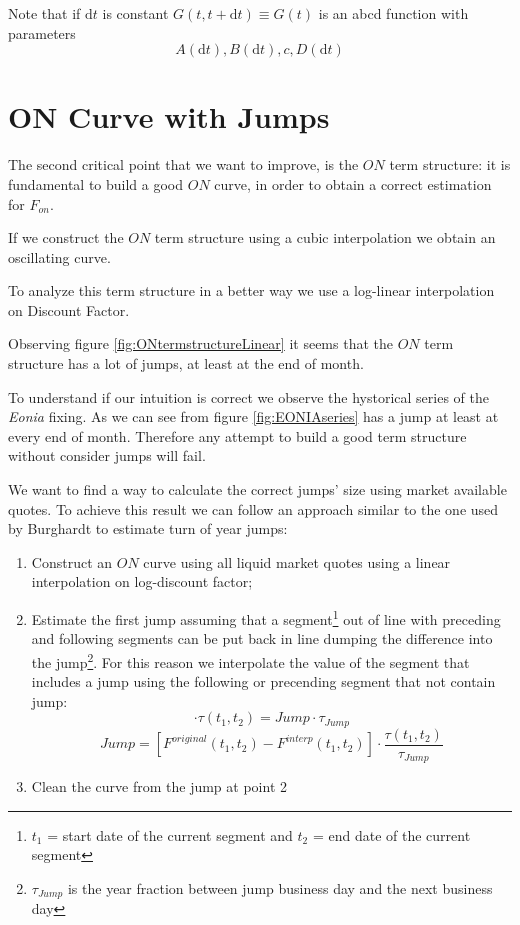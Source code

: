 \documentclass{article}
\begin{document}
\begin{appendices}
\begin{itemize}
Note that if $\mathrm{d}t$ is constant $G(t,t+\mathrm{d}t)\equiv G(t)$ is an abcd function with parameters $$A(\mathrm{d}t),B(\mathrm{d}t),c,D(\mathrm{d}t)$$

\end{itemize}

\section{ON Curve with Jumps} \label{app:ON Curve with Jumps}
The second critical point that we want to improve, is the $ON$ term structure: it is fundamental to build a good $ON$ curve, in order to obtain a correct estimation for $F_{on}$.

If we construct the $ON$ term structure using a cubic interpolation we obtain an oscillating curve.

To analyze this term structure in a better way we use a log-linear interpolation on Discount Factor.

Observing figure \ref{fig:ONtermstructureLinear} it seems that the $ON$ term structure has a lot of jumps, at least at the end of month.

To understand if our intuition is correct we observe the hystorical series of the \textit{Eonia} fixing. As we can see from figure \ref{fig:EONIAseries} has a jump at least at every end of month. Therefore any attempt to build a good term structure without consider jumps will fail.

We want to find a way to calculate the correct jumps' size using market available quotes. To achieve this result we can follow an approach similar to the one used by Burghardt \cite{Burghardt} to estimate turn of year jumps:
\begin{enumerate}
\item Construct an $ON$ curve using all liquid market quotes using a linear interpolation on log-discount factor;
\item Estimate the first jump assuming that a segment\footnote{$t_1$ = start date of the current segment and $t_2$ = end date of the current segment} out of line with preceding and following segments can be put back in line dumping the difference into the jump\footnote{$\tau_{Jump}$ is the year fraction between jump business day and the next business day}. For this reason we interpolate the value of the segment that includes a jump using the following or precending segment that not contain jump:
        \begin{equation}
        [F^{original}(t_1,t_2) - F^{interp}(t_1,t_2)] \cdot \tau(t_1,t_2) = Jump \cdot \tau_{Jump}
        \end{equation}
        \begin{equation}
        Jump = [F^{original}(t_1,t_2) - F^{interp}(t_1,t_2)]\cdot \frac{\tau(t_1,t_2)}{\tau_{Jump}}
        \end{equation}
\item Clean the curve from the jump at point 2
\end{enumerate}


\end{appendices}
\end{document}
